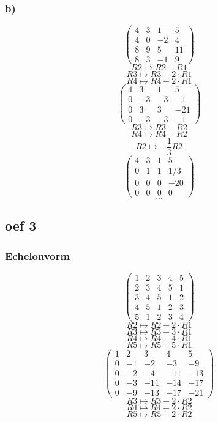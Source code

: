 \documentclass[10pt,a4paper]{article}
\begin{document}
\subsubsection*{b)}
\[
\begin{pmatrix}
4 & 3 & 1 & 5\\
4 & 0 & -2 & 4\\
8 & 9 & 5 & 11\\
8 & 3 & -1 & 9
\end{pmatrix}
\]
\[ R2 \longmapsto R2 - R1\]
\[ R3 \longmapsto R3 - 2\cdot R1\]
\[ R4 \longmapsto R4 - 2\cdot R1\]
\[
\begin{pmatrix}
4 & 3 & 1 & 5\\
0 & -3 & -3 & -1\\
0 & 3 & 3 & -21\\
0 & -3 & -3 & -1
\end{pmatrix}
\]
\[ R3 \longmapsto R3 + R2\]
\[ R4 \longmapsto R4 - R2\]
\[ R2 \longmapsto -\frac{1}{3}R2\]
\[
\begin{pmatrix}
4 & 3 & 1 & 5\\
0 & 1 & 1 & 1/3\\
0 & 0 & 0 & -20\\
0 & 0 & 0 & 0
\end{pmatrix}
\]
\[...\]

\subsection*{oef 3}
\subsubsection*{Echelonvorm}
\[
\begin{pmatrix}
1 &  2 &  3 &  4 &  5\\
2 &  3 &  4 &  5 &  1\\
3 &  4 &  5 &  1 &  2\\
4 &  5 &  1 &  2 &  3\\
5 &  1 &  2 &  3 &  4 
\end{pmatrix}
\]
\[ R2 \longmapsto R2 -2\cdot R1\]
\[ R3 \longmapsto R3 -3\cdot R1\]
\[ R4 \longmapsto R4 -4\cdot R1\]
\[ R5 \longmapsto R5 -5\cdot R1\]
\[
\begin{pmatrix}
1 &  2 &  3 &  4 &  5 \\
0 & -1 & -2 & -3 & -9 \\
0 & -2 & -4 & -11& -13\\
0 & -3 & -11& -14& -17\\
0 & -9 & -13& -17& -21
\end{pmatrix}
\]
\[ R3 \longmapsto R3 -2\cdot R2\]
\[ R4 \longmapsto R4 -2\cdot R2\]
\[ R5 \longmapsto R5 -2\cdot R2\]
\end{document}

